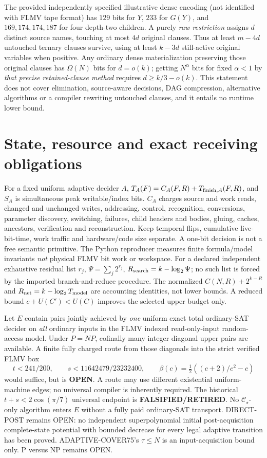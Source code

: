 \documentclass[11pt]{article}
\newcommand{\CS}{\mathcal C_\star}
\begin{document}
The provided independently specified illustrative dense encoding (not identified with FLMV tape format) has \(129\) bits for \(Y\), \(233\) for \(G(Y)\), and \(169,174,174,187\) for four depth-two children. A purely \emph{raw restriction} assigns \(d\) distinct source names, touching at most \(4d\) original clauses. Thus at least \(m-4d\) untouched ternary clauses survive, using at least \(k-3d\) still-active original variables when positive. Any ordinary dense materialization preserving those original clauses has \(\Omega(N)\) bits for \(d=o(k)\); getting \(N^\alpha\) bits for fixed \(\alpha<1\) by \emph{that precise retained-clause method} requires \(d\ge k/3-o(k)\). This statement does not cover elimination, source-aware decisions, DAG compression, alternative algorithms or a compiler rewriting untouched clauses, and it entails no runtime lower bound.

\section{State, resource and exact receiving obligations}
For a fixed uniform adaptive decider \(A\), \(T_A(F)=C_A(F,R)+T_{{\rm finish},A}(F,R)\), and \(S_A\) is simultaneous peak writable/index bits. \(C_A\) charges source and work reads, changed and unchanged writes, addressing, control, recognition, conversions, parameter discovery, switching, failures, child headers and bodies, gluing, caches, ancestors, verification and reconstruction. Keep temporal flips, cumulative live-bit-time, work traffic and hardware/code size separate. A one-bit decision is not a free semantic primitive. The Python reproducer measures finite formula/model invariants \emph{not} physical FLMV bit work or workspace. For a declared independent exhaustive residual list \(r_j\), \(\Psi=\sum_j2^{r_j}\), \(R_{\rm search}=k-\log_2\Psi\); no such list is forced by the imported branch-and-reduce procedure. The normalized \(C(N,R)+2^{k-R}\) and \(R_{\rm net}=k-\log_2 T_{\rm model}\) are accounting identities, not lower bounds. A reduced bound \(c+U(C')<U(C)\) improves the selected upper budget only.

Let \(E\) contain pairs jointly achieved by \emph{one} uniform exact total ordinary-SAT decider on \emph{all} ordinary inputs in the FLMV indexed read-only-input random-access model. Under \(P=NP\), cofinally many integer diagonal upper pairs are available. A finite fully charged route from those diagonals into the strict verified FLMV box
\[
 t<241/200,\qquad s<11642479/23232400,\qquad
 \beta(c)=\tfrac12((c+2)/c^2-c)
\]
would suffice, but is \textbf{OPEN}. A route may use different existential uniform-machine edges; no universal compiler is inherently required. The historical \(t+s<2\cos(\pi/7)\) universal endpoint is \textbf{FALSIFIED/RETIRED}. No \(\CS\)-only algorithm enters \(E\) without a fully paid ordinary-SAT transport. DIRECT-POST remains OPEN: no independent superpolynomial initial post-acquisition complete-state potential with bounded decrease for every legal adaptive transition has been proved. ADAPTIVE-COVER75's \(\tau\le N\) is an input-acquisition bound only. P versus NP remains OPEN.
\end{document}
